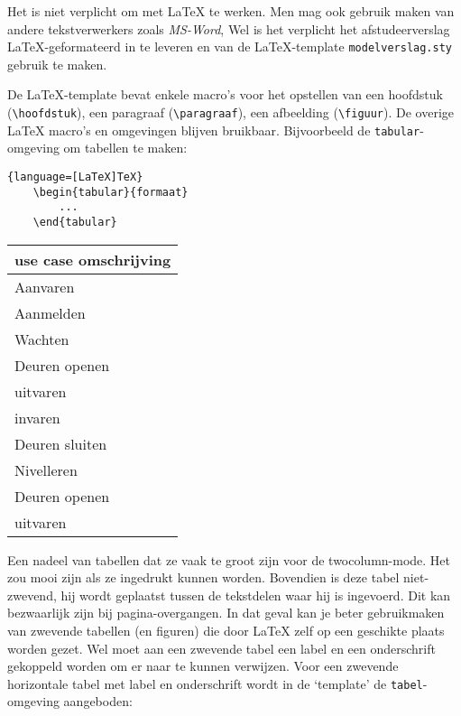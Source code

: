 
Het is niet verplicht om met \LaTeX{} te werken. Men mag ook gebruik
maken van andere tekstverwerkers zoals \emph{MS-Word}, Wel is het
verplicht het afstudeerverslag \LaTeX{}-geformateerd in te leveren en
van de \LaTeX{}-template \verb!modelverslag.sty! gebruik te
maken.

De \LaTeX{}-template bevat enkele macro's voor het opstellen van een
hoofdstuk (\verb!\hoofdstuk!), een paragraaf (\verb!\paragraaf!), een
afbeelding (\verb!\figuur!). De overige \LaTeX{} macro's en omgevingen
blijven bruikbaar. Bijvoorbeeld de \verb!tabular!-omgeving om tabellen
te maken:

\begin{lstlisting}{language=[LaTeX]TeX}
	\begin{tabular}{formaat}
		... 
	\end{tabular}
\end{lstlisting}


\begin{center}
	\begin{tabular}{|l||r|}
		\hline
		\multicolumn{2}{|c|}{use case omschrijving}\\
		\hline
		Aanvaren     & \the\paperwidth\\
		Aanmelden      & \the\textwidth\\
		Wachten    & \the\columnwidth\\
		Deuren openen & \the\columnsep\\
		uitvaren  & \the\oddsidemargin\\
		invaren & \the\evensidemargin\\
		Deuren sluiten    & \the\paperheight\\
		Nivelleren     & \the\textheight\\
		Deuren openen & \the\columnsep\\
		uitvaren  & \the\oddsidemargin\\
		
		\hline
	\end{tabular}
\end{center}

Een nadeel van tabellen dat ze vaak te groot zijn voor de
twocolumn-mode. Het zou mooi zijn als ze ingedrukt kunnen
worden. Bovendien is deze tabel niet-zwevend, hij wordt geplaatst
tussen de tekstdelen waar hij is ingevoerd. Dit kan bezwaarlijk zijn
bij pagina-overgangen. In dat geval kan je beter gebruikmaken van
zwevende tabellen (en figuren) die door \LaTeX{} zelf op een geschikte
plaats worden gezet. Wel moet aan een zwevende tabel een label en een
onderschrift gekoppeld worden om er naar te kunnen verwijzen. Voor een
zwevende horizontale tabel met label en onderschrift wordt in de
`template' de \verb!tabel!-omgeving aangeboden:\\

